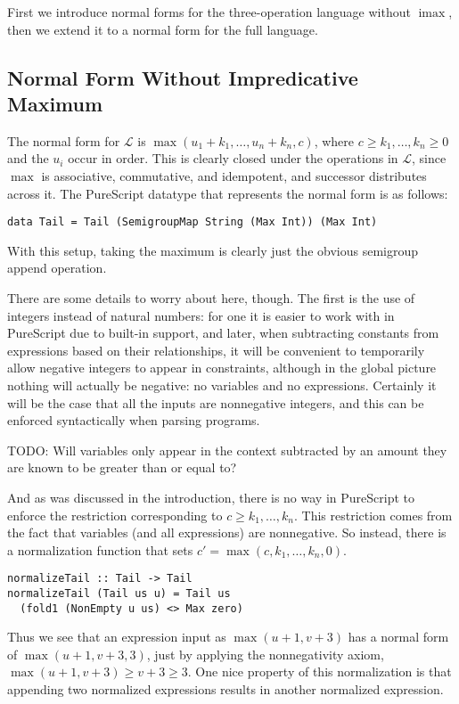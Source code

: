\documentclass[11pt, twoside, reqno]{book}
\DeclareMathOperator{\imax}{imax}
\begin{document}
First we introduce normal forms for the three-operation language without $\imax$, then we extend it to a normal form for the full language.

\subsection{Normal Form Without Impredicative Maximum}

The normal form for $\mathcal{L}$ is $\max(u_1 + k_1, \dots, u_n + k_n, c)$, where $c \ge k_1, \dots, k_n \ge 0$ and the $u_i$ occur in order.
This is clearly closed under the operations in $\mathcal{L}$, since $\max$ is associative, commutative, and idempotent, and successor distributes across it.
The PureScript datatype that represents the normal form is as follows:
\begin{verbatim}
data Tail = Tail (SemigroupMap String (Max Int)) (Max Int)
\end{verbatim}
With this setup, taking the maximum is clearly just the obvious semigroup append operation.

There are some details to worry about here, though.
The first is the use of integers instead of natural numbers:
for one it is easier to work with in PureScript due to built-in support,
and later, when subtracting constants from expressions based on their relationships,
it will be convenient to temporarily allow negative integers to appear in constraints, although in the global picture nothing will actually be negative: no variables and no expressions.
Certainly it will be the case that all the inputs are nonnegative integers, and this can be enforced syntactically when parsing programs.

TODO: Will variables only appear in the context subtracted by an amount they are known to be greater than or equal to?

And as was discussed in the introduction, there is no way in PureScript to enforce the restriction corresponding to $c \ge k_1, \dots, k_n$.
This restriction comes from the fact that variables (and all expressions) are nonnegative.
So instead, there is a normalization function that sets $c\prime = \max(c, k_1, \dots, k_n, 0)$.
\begin{verbatim}
normalizeTail :: Tail -> Tail
normalizeTail (Tail us u) = Tail us
  (fold1 (NonEmpty u us) <> Max zero)
\end{verbatim}
Thus we see that an expression input as $\max(u+1, v+3)$ has a normal form of $\max(u+1, v+3, 3)$, just by applying the nonnegativity axiom, $\max(u+1, v+3) \ge v+3 \ge 3$.
One nice property of this normalization is that appending two normalized expressions results in another normalized expression.
\end{document}
